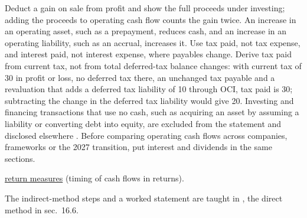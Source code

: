 \begin{qfmethod}
 Deduct a gain on sale from profit and show the full proceeds under investing; adding the proceeds to operating cash flow counts the gain twice. An increase in an operating asset, such as a prepayment, reduces cash, and an increase in an operating liability, such as an accrual, increases it. Use tax paid, not tax expense, and interest paid, not interest expense, where payables change. Derive tax paid from current tax, not from total deferred-tax balance changes: with current tax of 30 in profit or loss, no deferred tax there, an unchanged tax payable and a revaluation that adds a deferred tax liability of 10 through OCI, tax paid is 30; subtracting the change in the deferred tax liability would give 20. Investing and financing transactions that use no cash, such as acquiring an asset by assuming a liability or converting debt into equity, are excluded from the statement and disclosed elsewhere \citep[IAS~7 paras.~43--44]{eu-2023-1803-ias7}. Before comparing operating cash flows across companies, frameworks or the 2027 transition, put interest and dividends in the same sections.

 \hyperref[def:return-measures]{return measures} (timing of cash flows in returns).

 The indirect-method steps and a worked statement are taught in \citep[secs.~16.3--16.4]{principles-financial-accounting-2019}, the direct method in sec.~16.6.

\end{qfmethod}

